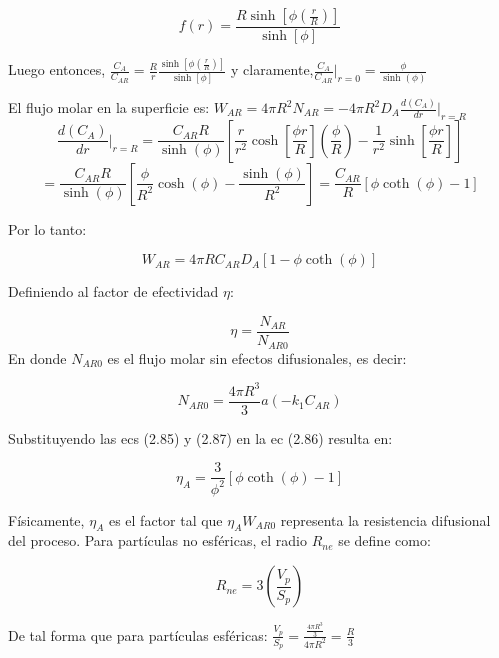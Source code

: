 \begin{equation*}
    f(r)=\frac{R\sinh[\phi(\frac{r}{R})]}{\sinh[\phi]}
\end{equation*}

Luego entonces, $\frac{C_A}{C_{AR}}=\frac{R}{r}\frac{\sinh[\phi(\frac{r}{R})]}{\sinh[\phi]}$ y claramente,$\frac{C_A}{C_{AR}}|_{r=0}=\frac{\phi}{\sinh(\phi)}$ 

El flujo molar en la superficie es: $W_{AR}=4\pi R^2N_{AR}=-4\pi R^2D_A\frac{d(C_A)}{dr}|_{r=R}$
\begin{equation*}
    \frac{d(C_A)}{dr}|_{r=R}=\frac{C_{AR}R}{\sinh (\phi)}[\frac{r}{r^2}\cosh[\frac{\phi r}{R}](\frac{\phi}{R})-\frac{1}{r^2}\sinh [\frac{\phi r}{R}]]
\end{equation*}
\begin{equation*}
    =\frac{C_{AR}R}{\sinh (\phi)}[\frac{\phi}{R^2}\cosh (\phi)-\frac{\sinh (\phi)}{R^2}]=\frac{C_{AR}}{R}[\phi \coth (\phi)-1]
\end{equation*}

Por lo tanto:

\begin{equation}
    W_{AR}=4\pi RC_{AR}D_A[1-\phi \coth (\phi)]
\end{equation}

Definiendo al factor de efectividad $\eta$:

\begin{equation}
    \eta=\frac{N_{AR}}{N_{AR0}}
\end{equation}
En donde $N_{AR0}$ es el flujo molar sin efectos difusionales, es decir:

\begin{equation}
    N_{AR0}=\frac{4\pi R^3}{3}a(-k_1C_{AR})
\end{equation}

Substituyendo las ecs (2.85) y (2.87) en la ec (2.86) resulta en: 

\begin{equation}
    \eta_A=\frac{3}{\phi^2}[\phi \coth (\phi)-1]
\end{equation}

Físicamente, $\eta_A$ es el factor tal que $\eta_AW_{AR0}$ representa la resistencia difusional del proceso. Para partículas no esféricas, el radio $R_{n e}$ se define como:

\begin{equation}
    R_{ne}=3(\frac{V_p}{S_p})
\end{equation}

De tal forma que para partículas esféricas: $\frac{V_p}{S_p}=\frac{\frac{4\pi R^3}{3}}{4\pi R^2}=\frac{R}{3}$

